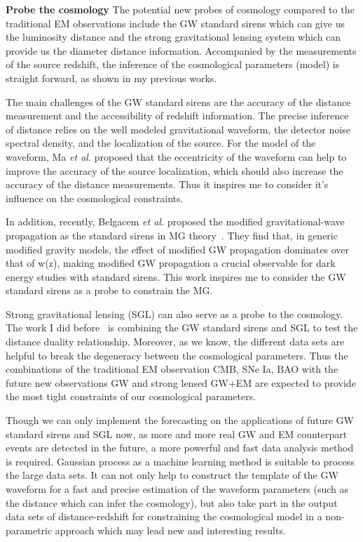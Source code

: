 \documentclass[11pt,letterpaper,sans]{moderncv}   %
\begin{document}
\vspace{2mm}
\noindent
\textcolor{color1}{\textbf{Probe the cosmology}}
The potential new probes of cosmology compared to the traditional EM observations include the GW standard sirens which can give us the luminosity distance and the strong gravitational lensing system which can provide us the diameter distance information. Accompanied by the measurements of the source redshift, the inference of the cosmological parameters (model) is straight forward, as shown in my previous works.

\vspace{2mm}
\noindent
The main challenges of the GW standard sirens are the accuracy of the distance measurement and the accessibility of redshift information. The precise inference of distance relies on the well modeled gravitational waveform, the detector noise spectral density, and the localization of the source. For the model of the waveform, Ma \textit{et al.} proposed that the eccentricity of the waveform can help to improve the accuracy of the source localization, which should also increase the accuracy of the distance measurements. Thus it inspires me to consider it's influence on the cosmological constraints.

\vspace{2mm}
\noindent
In addition, recently, Belgacem \textit{et al.} proposed the modified gravitational-wave propagation as the standard sirens in MG theory~\cite{Belgacem:2018lbp}. They find that, in generic modified gravity models, the effect of modified GW propagation dominates over that of w(z), making modified GW propagation a crucial observable for dark energy studies with standard sirens. This work inspires me to consider the GW standard sirens as a probe to constrain the MG.



\vspace{2mm}
\noindent
Strong gravitational lensing (SGL) can also serve as a probe to the cosmology. The work I did before~\cite{Yang:2017bkv} is combining the GW standard sirens and SGL to test the distance duality relationship. Moreover, as we know, the different data sets are helpful to break the degeneracy between the cosmological parameters. Thus the combinations of the traditional EM observation CMB, SNe Ia, BAO with the future new observations GW and strong lensed GW+EM are expected to provide the most tight constraints of our cosmological parameters. 

\vspace{2mm}
\noindent
Though we can only implement the forecasting on the applications of future GW standard sirens and SGL now, as more and more real GW and EM counterpart events 
are detected in the future, a more powerful and fast data analysis method is required. Gaussian process as a machine learning method is suitable to process the large data sets. It can not only help to construct the template of the GW waveform for a fast and precise estimation of the waveform parameters (such as the distance which can infer the cosmology), but also take part in the output data sets of distance-redshift for constraining the cosmological model in a non-parametric approach which may lead new and interesting results.  
\end{document}
